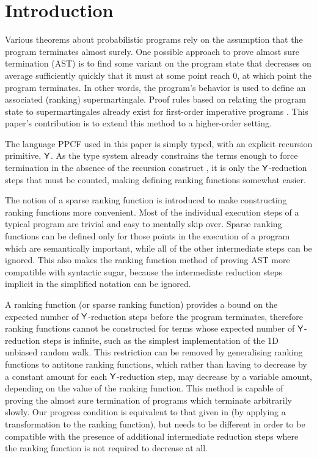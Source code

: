 
\section{Introduction}
\label{sec:intro}


Various theorems about probabilistic programs rely on the assumption that the program terminates almost surely. One possible approach to prove almost sure termination (AST) is to find some variant on the program state that decreases on average sufficiently quickly that it must at some point reach 0, at which point the program terminates. In other words, the program's behavior is used to define an associated (ranking) supermartingale. Proof rules based on relating the program state to supermartingales already exist for first-order imperative programs \cite{DBLP:conf/cav/ChakarovS13,DBLP:conf/popl/FioritiH15,DBLP:journals/pacmpl/McIverMKK18}. This paper's contribution is to extend this method to a higher-order setting.

The language PPCF used in this paper is simply typed, with an explicit recursion primitive, $\mathsf{Y}$. As the type system already constrains the terms enough to force termination in the absence of the recursion construct \cite{tait1967,BarendregtDS2010}, it is only the $\mathsf{Y}$-reduction steps that must be counted, making defining ranking functions somewhat easier.

The notion of a sparse ranking function is introduced to make constructing ranking functions more convenient. Most of the individual execution steps of a typical program are trivial and easy to mentally skip over. Sparse ranking functions can be defined only for those points in the execution of a program which are semantically important, while all of the other intermediate steps can be ignored. This also makes the ranking function method of proving AST more compatible with syntactic sugar, because the intermediate reduction steps implicit in the simplified notation can be ignored.

A ranking function (or sparse ranking function) provides a bound on the expected number of $\mathsf{Y}$-reduction steps before the program terminates, therefore ranking functions cannot be constructed for terms whose expected number of $\mathsf{Y}$-reduction steps is infinite, such as the simplest implementation of the 1D unbiased random walk. This restriction can be removed by generalising ranking functions to antitone ranking functions, which rather than having to decrease by a constant amount for each $\mathsf{Y}$-reduction step, may decrease by a variable amount, depending on the value of the ranking function. This method is capable of proving the almost sure termination of programs which terminate arbitrarily slowly. Our progress condition is equivalent to that given in \cite{DBLP:journals/pacmpl/McIverMKK18} (by applying a transformation to the ranking function), but needs to be different in order to be compatible with the presence of additional intermediate reduction steps where the ranking function is not required to decrease at all.

